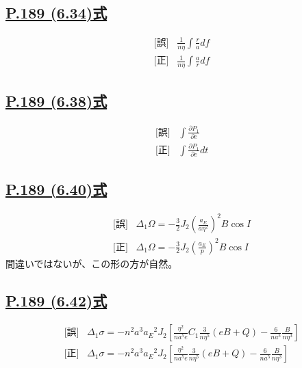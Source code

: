 \documentclass[9pt,fleqn]{bxjsarticle}
\begin{document}
\subsection*{\underline{P.189 (6.34)式}}
\begin{align*}
    &\text{[誤]} \hspace{10pt} \frac{1}{n\eta}{\int}\frac{r}{a}df \\
    &\text{[正]} \hspace{10pt} \frac{1}{n\eta}{\int}\frac{a}{r}df  
\end{align*}

\subsection*{\underline{P.189 (6.38)式}}
\begin{align*}
    &\text{[誤]} \hspace{10pt} {\int}\frac{\partial{P_1}}{\partial{e}} \\
    &\text{[正]} \hspace{10pt} {\int}\frac{\partial{P_1}}{\partial{e}}dt 
\end{align*}

\subsection*{\underline{P.189 (6.40)式}}
\begin{align*}
    &\text{[誤]} \hspace{10pt} \varDelta_1\Omega = -\frac{3}{2}J_2\left(\frac{a_E}{a\eta^2}\right)^2B\cos{I} \\
    &\text{[正]} \hspace{10pt} \varDelta_1\Omega = -\frac{3}{2}J_2\left(\frac{a_E}{p}\right)^2B\cos{I}
\end{align*}
間違いではないが、この形の方が自然。

\subsection*{\underline{P.189 (6.42)式}}
\begin{align*}
    &\text{[誤]} \hspace{10pt} \varDelta_1\sigma = -n^2a^3{a_E}^2J_2\left[\frac{\eta^2}{na^5e}C_1\frac{3}{n\eta^5}\left(eB+Q\right)-\frac{6}{na^5}\frac{B}{n\eta^3}\right] \\
    &\text{[正]} \hspace{10pt} \varDelta_1\sigma = -n^2a^3{a_E}^2J_2\left[\frac{\eta^2}{na^5e}\frac{3}{n\eta^5}\left(eB+Q\right)-\frac{6}{na^5}\frac{B}{n\eta^3}\right]
\end{align*}
\end{document}
